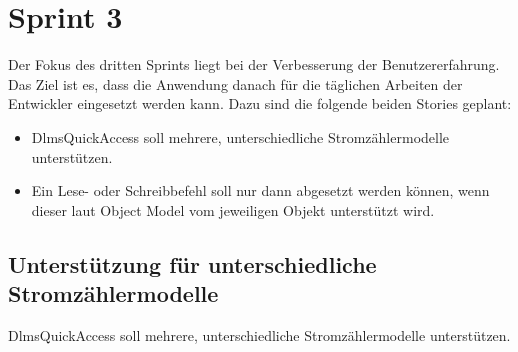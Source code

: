 \section{Sprint 3}
Der Fokus des dritten Sprints liegt bei der Verbesserung der Benutzererfahrung.
Das Ziel ist es, dass die Anwendung danach für die täglichen Arbeiten der Entwickler eingesetzt werden kann.
Dazu sind die folgende beiden Stories geplant:
\begin{itemize}
   \item DlmsQuickAccess soll mehrere, unterschiedliche Stromzählermodelle unterstützen.
   \item Ein Lese- oder Schreibbefehl soll nur dann abgesetzt werden können, wenn dieser laut Object Model vom jeweiligen Objekt unterstützt wird.
\end{itemize}




\subsection{Unterstützung für unterschiedliche Stromzählermodelle}
\dq  DlmsQuickAccess soll mehrere, unterschiedliche Stromzählermodelle unterstützen.\dq
